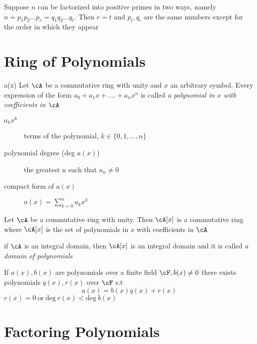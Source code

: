 \documentclass[11pt, oneside, dvipdfmx]{book}
\begin{document}
\begin{MyTheorem}
Suppose $n$ can be factorized into positive primes in two ways, namely $n= p_1p_2...p_r =  q_1q_2...q_t$. Then $r=t$ and $p_i,q_i$ are the same numbers except for the order in which they appear
\end{MyTheorem}

\section{Ring of Polynomials}
\begin{MyDefinition}{a(x)}
Let $\cA$ be a commutative ring with unity  and $x$ an arbitrary symbol. Every expression of the form $a_0 +a_1x+....+a_nx^n$ is called \textit{a polynomial in $x$ with coefficients in $\cA$}
\end{MyDefinition}

\begin{description}
\item[$a_kx^k$] terms of the polynomial, $k\in\{0,1,...,n \}$

\item[polynomial degree (deg $a(x)$)] the greatest n such that $a_n \neq 0$

\item[compact form of $a(x)$]  $a(x)= \sum_{k=0}^{n}a_kx^k$
\end{description}

\begin{MyTheorem}
Let $\cA$ be a commutative ring with unity. Then $\cA[x]$ is a commutative ring where $\cA[x]$ is the set of polynomials in $x$ with coefficients in $\cA$
\end{MyTheorem}

\begin{MyTheorem}
if $\cA$ is an integral domain, then $\cA[x]$ is an integral domain and it is called \textit{a domain of polynomials}
\end{MyTheorem}

\begin{MyTheorem}
If $a(x), b(x)$ are polynomials over a finite field $\cF, b(x) \neq 0$ there exists polynomials $q(x),r(x)$ over $\cF$ s.t $$ a(x) =b(x)q(x) + r(x)$$ $r(x)=0 ~\text{or}~ \text{deg} ~r(x) < \text{deg} ~b(x) $
\end{MyTheorem}

\section{Factoring Polynomials}
\end{document}
